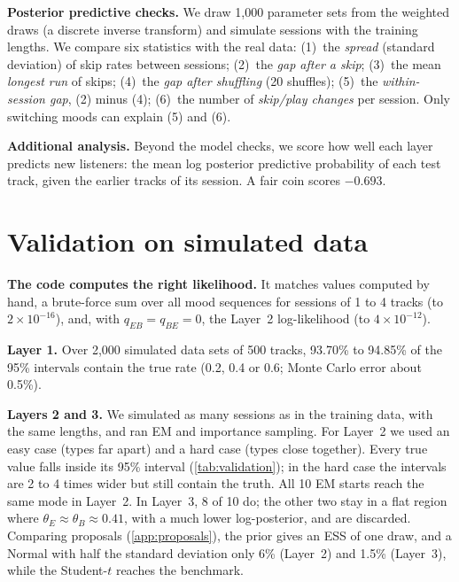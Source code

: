 \documentclass[12pt]{article}
\begin{document}
\textbf{Posterior predictive checks.} We draw 1{,}000 parameter sets from the weighted draws (a discrete inverse transform) and simulate sessions with the training lengths. We compare six statistics with the real data: (1)~the \emph{spread} (standard deviation) of skip rates between sessions; (2)~the \emph{gap after a skip}; (3)~the mean \emph{longest run} of skips; (4)~the \emph{gap after shuffling} (20 shuffles); (5)~the \emph{within-session gap}, (2) minus (4); (6)~the number of \emph{skip/play changes} per session. Only switching moods can explain (5) and (6).

\textbf{Additional analysis.} Beyond the model checks, we score how well each layer predicts new listeners: the mean log posterior predictive probability of each test track, given the earlier tracks of its session. A fair coin scores $-0.693$.

\section{Validation on simulated data}\label{sec:validation}

\textbf{The code computes the right likelihood.} It matches values computed by hand, a brute-force sum over all mood sequences for sessions of 1 to 4 tracks (to $2 \times 10^{-16}$), and, with $q_{EB} = q_{BE} = 0$, the Layer~2 log-likelihood (to $4 \times 10^{-12}$).

\textbf{Layer 1.} Over 2{,}000 simulated data sets of 500 tracks, 93.70\% to 94.85\% of the 95\% intervals contain the true rate (0.2, 0.4 or 0.6; Monte Carlo error about 0.5\%).

\textbf{Layers 2 and 3.} We simulated as many sessions as in the training data, with the same lengths, and ran EM and importance sampling. For Layer~2 we used an easy case (types far apart) and a hard case (types close together). Every true value falls inside its 95\% interval (\cref{tab:validation}); in the hard case the intervals are 2 to 4 times wider but still contain the truth. All 10 EM starts reach the same mode in Layer~2. In Layer~3, 8 of 10 do; the other two stay in a flat region where $\theta_E \approx \theta_B \approx 0.41$, with a much lower log-posterior, and are discarded. Comparing proposals (\cref{app:proposals}), the prior gives an ESS of one draw, and a Normal with half the standard deviation only 6\% (Layer~2) and 1.5\% (Layer~3), while the Student-$t$ reaches the benchmark.
\end{document}
